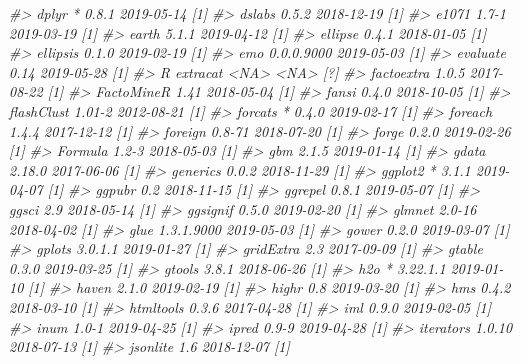 \documentclass[]{krantz}
\makeatletter
\newenvironment{Shaded}{\begin{snugshade}}{\end{snugshade}}
\newcommand{\CommentTok}[1]{\textcolor[rgb]{0.37,0.37,0.37}{\textit{#1}}}
\newenvironment{kframe}{%
\medskip{}
\setlength{\fboxsep}{.8em}
 \def\at@end@of@kframe{}%
 \ifinner\ifhmode%
  \def\at@end@of@kframe{\end{minipage}}%
  \begin{minipage}{\columnwidth}%
 \fi\fi%
 \def\FrameCommand##1{\hskip\@totalleftmargin \hskip-\fboxsep
 \colorbox{shadecolor}{##1}\hskip-\fboxsep
     \hskip-\linewidth \hskip-\@totalleftmargin \hskip\columnwidth}%
 \MakeFramed {\advance\hsize-\width
   \@totalleftmargin\z@ \linewidth\hsize
   \@setminipage}}%
 {\par\unskip\endMakeFramed%
 \at@end@of@kframe}
\renewenvironment{Shaded}{\begin{kframe}}{\end{kframe}}
\makeatother
\begin{document}
\begin{Shaded}
\begin{Highlighting}[]
\CommentTok{#>    dplyr         * 0.8.1      2019-05-14 [1]}
\CommentTok{#>    dslabs          0.5.2      2018-12-19 [1]}
\CommentTok{#>    e1071           1.7-1      2019-03-19 [1]}
\CommentTok{#>    earth           5.1.1      2019-04-12 [1]}
\CommentTok{#>    ellipse         0.4.1      2018-01-05 [1]}
\CommentTok{#>    ellipsis        0.1.0      2019-02-19 [1]}
\CommentTok{#>    emo             0.0.0.9000 2019-05-03 [1]}
\CommentTok{#>    evaluate        0.14       2019-05-28 [1]}
\CommentTok{#>  R extracat        <NA>       <NA>       [?]}
\CommentTok{#>    factoextra      1.0.5      2017-08-22 [1]}
\CommentTok{#>    FactoMineR      1.41       2018-05-04 [1]}
\CommentTok{#>    fansi           0.4.0      2018-10-05 [1]}
\CommentTok{#>    flashClust      1.01-2     2012-08-21 [1]}
\CommentTok{#>    forcats       * 0.4.0      2019-02-17 [1]}
\CommentTok{#>    foreach         1.4.4      2017-12-12 [1]}
\CommentTok{#>    foreign         0.8-71     2018-07-20 [1]}
\CommentTok{#>    forge           0.2.0      2019-02-26 [1]}
\CommentTok{#>    Formula         1.2-3      2018-05-03 [1]}
\CommentTok{#>    gbm             2.1.5      2019-01-14 [1]}
\CommentTok{#>    gdata           2.18.0     2017-06-06 [1]}
\CommentTok{#>    generics        0.0.2      2018-11-29 [1]}
\CommentTok{#>    ggplot2       * 3.1.1      2019-04-07 [1]}
\CommentTok{#>    ggpubr          0.2        2018-11-15 [1]}
\CommentTok{#>    ggrepel         0.8.1      2019-05-07 [1]}
\CommentTok{#>    ggsci           2.9        2018-05-14 [1]}
\CommentTok{#>    ggsignif        0.5.0      2019-02-20 [1]}
\CommentTok{#>    glmnet          2.0-16     2018-04-02 [1]}
\CommentTok{#>    glue            1.3.1.9000 2019-05-03 [1]}
\CommentTok{#>    gower           0.2.0      2019-03-07 [1]}
\CommentTok{#>    gplots          3.0.1.1    2019-01-27 [1]}
\CommentTok{#>    gridExtra       2.3        2017-09-09 [1]}
\CommentTok{#>    gtable          0.3.0      2019-03-25 [1]}
\CommentTok{#>    gtools          3.8.1      2018-06-26 [1]}
\CommentTok{#>    h2o           * 3.22.1.1   2019-01-10 [1]}
\CommentTok{#>    haven           2.1.0      2019-02-19 [1]}
\CommentTok{#>    highr           0.8        2019-03-20 [1]}
\CommentTok{#>    hms             0.4.2      2018-03-10 [1]}
\CommentTok{#>    htmltools       0.3.6      2017-04-28 [1]}
\CommentTok{#>    iml             0.9.0      2019-02-05 [1]}
\CommentTok{#>    inum            1.0-1      2019-04-25 [1]}
\CommentTok{#>    ipred           0.9-9      2019-04-28 [1]}
\CommentTok{#>    iterators       1.0.10     2018-07-13 [1]}
\CommentTok{#>    jsonlite        1.6        2018-12-07 [1]}

\end{Highlighting}
\end{Shaded}
\end{document}
